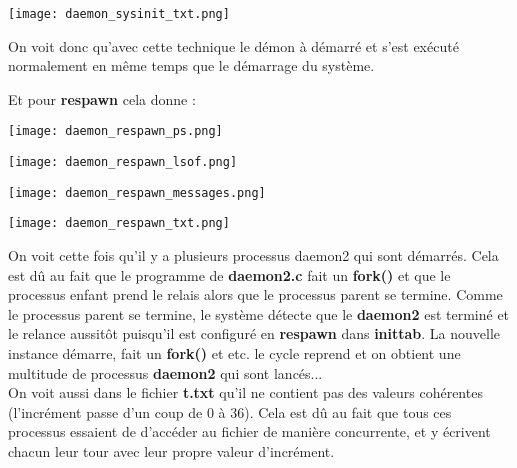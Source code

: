 \begin{center} 
\hspace{15cm}
\texttt{[image: daemon\_sysinit\_txt.png]}
\end{center}
\vspace{0.5cm}

On voit donc qu'avec cette technique le démon à démarré et s'est exécuté normalement en même temps que le démarrage du système.

Et pour \textbf{respawn} cela donne :

\begin{center} 
\hspace{15cm}
\texttt{[image: daemon\_respawn\_ps.png]}
\end{center}
\vspace{0.5cm}

\begin{center} 
\hspace{15cm}
\texttt{[image: daemon\_respawn\_lsof.png]}
\end{center}
\vspace{0.5cm}

\begin{center} 
\hspace{15cm}
\texttt{[image: daemon\_respawn\_messages.png]}
\end{center}
\vspace{0.5cm}

\begin{center} 
\hspace{15cm}
\texttt{[image: daemon\_respawn\_txt.png]}
\end{center}
\vspace{0.5cm}

On voit cette fois qu'il y a plusieurs processus daemon2 qui sont démarrés. Cela est dû au fait que le programme de \textbf{daemon2.c} fait un \textbf{fork()} et que le processus enfant prend le relais alors que le processus parent se termine. Comme le processus parent se termine, le système détecte que le \textbf{daemon2} est terminé et le relance aussitôt puisqu'il est configuré en \textbf{respawn} dans \textbf{inittab}. La nouvelle instance démarre, fait un \textbf{fork()} et etc. le cycle reprend et on obtient une multitude de processus \textbf{daemon2} qui sont lancés...\\

On voit aussi dans le fichier \textbf{t.txt} qu'il ne contient pas des valeurs cohérentes (l'incrément passe d'un coup de 0 à 36). Cela est dû au fait que tous ces processus essaient de d'accéder au fichier de manière concurrente, et y écrivent chacun leur tour avec leur propre valeur d'incrément.


